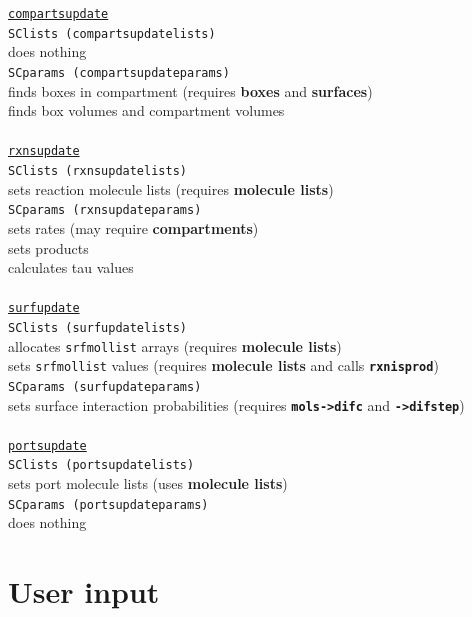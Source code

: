 \documentclass {scrbook}
\newcommand {\ttt} {\texttt}
\begin{document}
\begin{tabbing}
\>\ttt{\underline{compartsupdate}}\\
\>\>\ttt{SClists (compartsupdatelists)}\\
\>\>\>does nothing\\
\>\>\ttt{SCparams (compartsupdateparams)}\\
\>\>\>finds boxes in compartment (requires \textbf{boxes} and \textbf{surfaces})\\
\>\>\>finds box volumes and compartment volumes\\
\>\\
\>\ttt{\underline{rxnsupdate}}\\
\>\>\ttt{SClists (rxnsupdatelists)}\\
\>\>\>sets reaction molecule lists (requires \textbf{molecule lists})\\
\>\>\ttt{SCparams (rxnsupdateparams)}\\
\>\>\>sets rates (may require \textbf{compartments})\\
\>\>\>sets products\\
\>\>\>calculates tau values\\
\>\\
\>\ttt{\underline{surfupdate}}\\
\>\>\ttt{SClists (surfupdatelists)}\\
\>\>\>allocates \ttt{srfmollist} arrays (requires \textbf{molecule lists})\\
\>\>\>sets \ttt{srfmollist} values (requires \textbf{molecule lists} and calls \ttt{\textbf{rxnisprod}})\\
\>\>\ttt{SCparams (surfupdateparams)}\\
\>\>\>sets surface interaction probabilities (requires \ttt{\textbf{mols->difc}} and \ttt{\textbf{->difstep}})\\
\>\\
\>\ttt{\underline{portsupdate}}\\
\>\>\ttt{SClists (portsupdatelists)}\\
\>\>\>sets port molecule lists (uses \textbf{molecule lists})\\
\>\>\ttt{SCparams (portsupdateparams)}\\
\>\>\>does nothing\\
\end{tabbing}


\section{User input}
\end{document}
